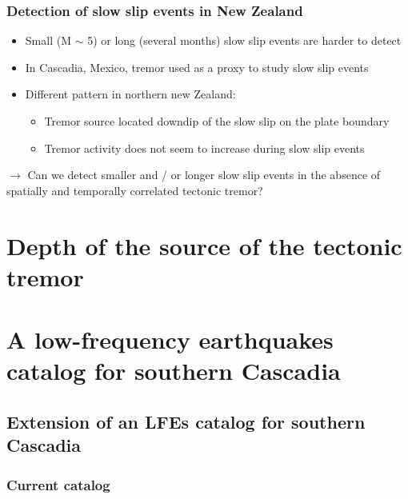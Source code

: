 \documentclass{beamer}
\begin{document}
	\begin{frame}
		\frametitle{Detection of slow slip events in New Zealand}
		\begin{itemize}
			\item Small (M $\sim$ 5) or long (several months) slow slip events are harder to detect
			\item In Cascadia, Mexico, tremor used as a proxy to study slow slip events
			\item Different pattern in northern new Zealand:
			\begin{itemize}
				\item Tremor source located downdip of the slow slip on the plate boundary
				\item Tremor activity does not seem to increase during slow slip events
			\end{itemize}
		\end{itemize}

		\begin{block}{}
			$\rightarrow$ Can we detect smaller and / or longer slow slip events in the absence of spatially and temporally correlated tectonic tremor?
		\end{block}			
	\end{frame}
				
	\section{Depth of the source of the tectonic tremor}

	\section{A low-frequency earthquakes catalog for southern Cascadia}

	\subsection{Extension of an LFEs catalog for southern Cascadia}
	
	\begin{frame}
		\frametitle{Current catalog}
	\end{frame}
\end{document}
